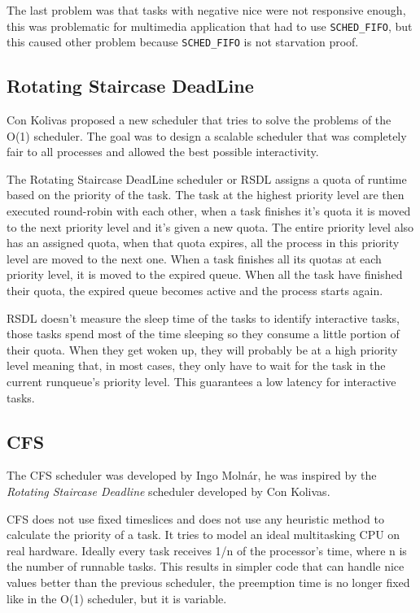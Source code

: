 \documentclass[10pt]{book}
\begin{document}
The last problem was that tasks with negative nice were not responsive enough, this was problematic for multimedia application that had to use \verb|SCHED_FIFO|, but this caused other problem because \verb|SCHED_FIFO| is not starvation proof.

\subsection{Rotating Staircase DeadLine}
Con Kolivas proposed a new scheduler that tries to solve the problems of the O(1) scheduler. The goal was to design a scalable scheduler that was completely fair to all processes and allowed the best possible interactivity.

The Rotating Staircase DeadLine scheduler or RSDL assigns a quota of runtime based on the priority of the task. The task at the highest priority level are then executed round-robin with each other, when a task finishes it's quota it is moved to the next priority level and it's given a new quota. The entire priority level also has an assigned quota, when that quota expires, all the process in this priority level are moved to the next one. When a task finishes all its quotas at each priority level, it is moved to the expired queue. When all the task have finished their quota, the expired queue becomes active and the process starts again.

RSDL doesn't measure the sleep time of the tasks to identify interactive tasks, those tasks spend most of the time sleeping so they consume a little portion of their quota. When they get woken up, they will probably be at a high priority level meaning that, in most cases, they only have to wait for the task in the current runqueue's priority level. This guarantees a low latency for interactive tasks. 

\subsection{CFS}
The CFS scheduler was developed by Ingo Molnár, he was inspired by the \textit{Rotating Staircase Deadline} scheduler developed by Con Kolivas. 

CFS does not use fixed timeslices and does not use any heuristic method to calculate the priority of a task. It tries to model an ideal multitasking CPU on real hardware. Ideally every task receives 1/n of the processor's time, where n is the number of runnable tasks. This results in simpler code that can handle nice values better than the previous scheduler, the preemption time is no longer fixed like in the O(1) scheduler, but it is variable.
\end{document}
